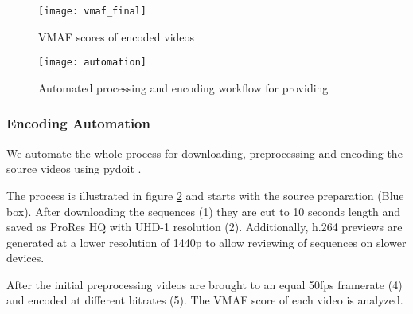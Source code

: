 \begin{figure}[!t]
	\centering
	\texttt{[image: vmaf\_final]}
	\caption{VMAF scores of encoded videos}
	\label{fig:vmaf:encoded}
\end{figure}

\begin{figure}[!t]
	\centering
	\texttt{[image: automation]}
	\caption{Automated processing and encoding workflow for providing }
	\label{fig:automation}
\end{figure}

\subsubsection{Encoding Automation}
We automate the whole process for downloading, preprocessing and encoding the source videos using pydoit \cite{web:pydoit}.

The process is illustrated in figure \ref{fig:automation} and starts with the source preparation (Blue box). After downloading the sequences (1) they are cut to 10 seconds length and saved as ProRes HQ with UHD-1 resolution (2). Additionally, h.264 previews are generated at a lower resolution of 1440p to allow reviewing of sequences on slower devices.

After the initial preprocessing videos are brought to an equal 50fps framerate (4) and encoded at different bitrates (5). The VMAF score of each video is analyzed.



